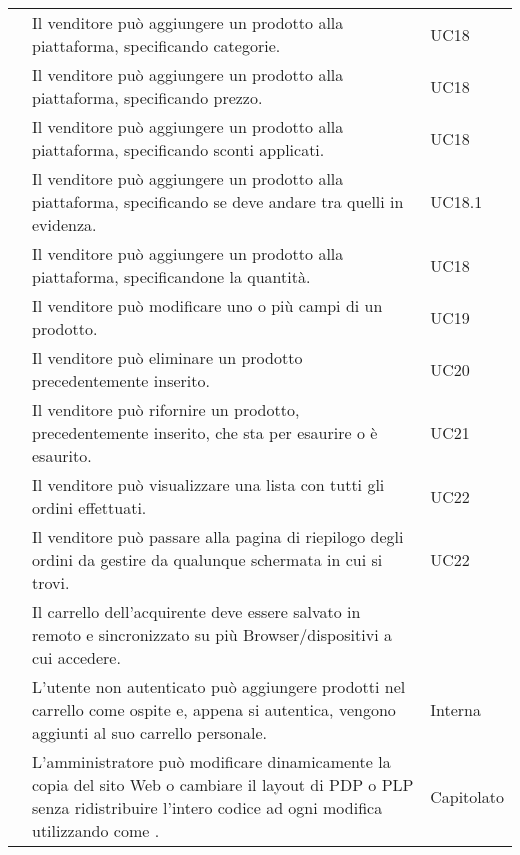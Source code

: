 \begin{longtable}{|c C{9.5cm} C{2.5cm}|}
     & Il venditore può aggiungere un prodotto alla piattaforma, specificando categorie. & UC18 \\
    
     & Il venditore può aggiungere un prodotto alla piattaforma, specificando prezzo. & UC18 \\
    
     & Il venditore può aggiungere un prodotto alla piattaforma, specificando sconti applicati. & UC18 \\
    
     & Il venditore può aggiungere un prodotto alla piattaforma, specificando se deve andare tra quelli in evidenza. & UC18.1 \\
    
     & Il venditore può aggiungere un prodotto alla piattaforma, specificandone la quantità. & UC18 \\
    
     & Il venditore può modificare uno o più campi di un prodotto. & UC19 \\
    
     & Il venditore può eliminare un prodotto precedentemente inserito. & UC20 \\
    
     & Il venditore può rifornire un prodotto, precedentemente inserito, che sta per esaurire o è esaurito. & UC21 \\
    
     & Il venditore può visualizzare una lista con tutti gli ordini effettuati. & UC22 \\
    
     & Il venditore può passare alla pagina di riepilogo degli ordini da gestire da qualunque schermata in cui si trovi. & UC22 \\
    
     & Il carrello dell'acquirente deve essere salvato in remoto e sincronizzato su più Browser/dispositivi a cui accedere. &  \\
    
     & L'utente non autenticato può aggiungere prodotti nel carrello come ospite e, appena si autentica, vengono aggiunti al suo carrello personale. & Interna \\
    
     & L'amministratore può modificare dinamicamente la copia del sito Web o cambiare il layout di PDP o PLP senza ridistribuire l'intero codice ad ogni modifica utilizzando  come . & Capitolato \\

\end{longtable}

   
\begin{comment}
\rfun{O}{6} & La ricerca di prodotti deve essere possibile dalla schermata principale e dalla \glo{PLP}. & 
\end{comment}